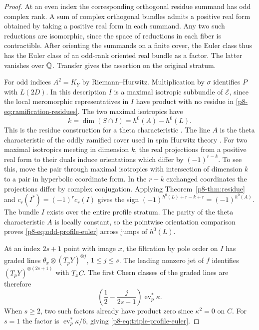 \begin{proof}
At an even index the corresponding orthogonal residue summand has odd
complex rank. A sum of complex orthogonal bundles admits a positive
real form obtained by taking a positive real form in each summand.
Any two such reductions are isomorphic, since the space of reductions
in each fiber is contractible. After orienting the summands on a
finite cover, the Euler class thus has the Euler class of an
odd-rank oriented real bundle as a factor. The latter vanishes over
\(\mathbb Q\). Transfer gives the assertion on the original stratum.

For odd indices \(A^2=K_Y\) by Riemann--Hurwitz. Multiplication by
\(\sigma\) identifies \(P\) with \(L(2D)\). In this description \(I\)
is a maximal isotropic subbundle of \(\mathcal E\), since the local
meromorphic representatives in \(I\) have product with no residue
in \eqref{p8-eq:ramification-residues}. The two maximal isotropics have
\[
                     k=\dim(S\cap I)=h^0(A)-h^0(L).
\]
This is the residue construction for a theta characteristic
\cite[\S1]{mumford}. The line \(A\) is the theta characteristic of the
oddly ramified cover used in spin Hurwitz theory \cite[\S1]{lp}.
For two maximal isotropics meeting in dimension \(k\), the real
projections from a positive real form to their duals induce
orientations which differ by \((-1)^{r-k}\). To see this, move the
pair through maximal isotropics with intersection of dimension \(k\)
to a pair in hyperbolic coordinate form. In the \(r-k\) exchanged
coordinates the projections differ by complex conjugation. Applying
Theorem~\ref{p8-thm:residue} and \(c_r(I^*)=(-1)^r c_r(I)\) gives the
sign \((-1)^{h^0(L)+r-k+r}=(-1)^{h^0(A)}\). The bundle \(I\) exists
over the entire profile stratum. The parity of the theta
characteristic \(A\) is locally constant, so the pointwise orientation
comparison proves \eqref{p8-eq:odd-profile-euler} across jumps of \(h^0(L)\).

At an index \(2s+1\) point with image \(x\), the filtration by pole
order on \(I\) has graded lines
\(\theta_x\otimes(T_pY)^{\otimes j}\), \(1\le j\le s\). The
leading nonzero jet of \(f\) identifies \((T_pY)^{\otimes(2s+1)}\)
with \(T_xC\). The first Chern classes of the graded lines are
therefore
\[
              \left(\frac12-\frac{j}{2s+1}\right)
                         \operatorname{ev}_p^*\kappa .
\]
When \(s\ge2\), two such factors already have product zero since
\(\kappa^2=0\) on \(C\). For \(s=1\) the factor is
\(\operatorname{ev}_p^*\kappa/6\), giving
\eqref{p8-eq:triple-profile-euler}.
\end{proof}

